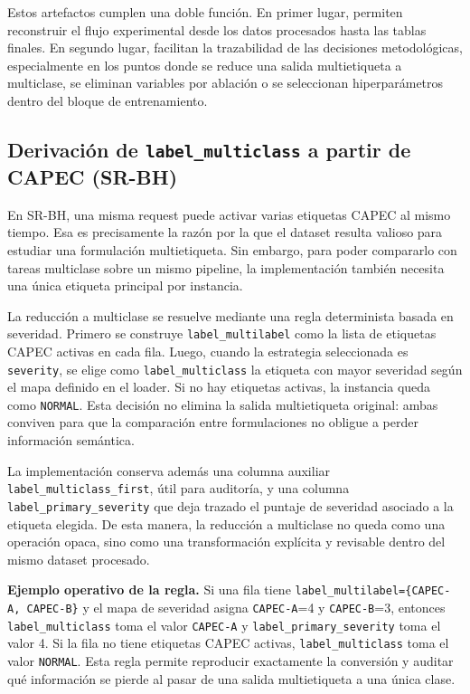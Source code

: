 \documentclass[12pt,oneside]{report}
\begin{document}
Estos artefactos cumplen una doble función. En primer lugar, permiten reconstruir el flujo experimental desde los datos procesados hasta las tablas finales. En segundo lugar, facilitan la trazabilidad de las decisiones metodológicas, especialmente en los puntos donde se reduce una salida multietiqueta a multiclase, se eliminan variables por ablación o se seleccionan hiperparámetros dentro del bloque de entrenamiento.

\subsection{Derivación de \texttt{label\_multiclass} a partir de CAPEC (SR-BH)}
En SR-BH, una misma request puede activar varias etiquetas CAPEC al mismo tiempo. Esa es precisamente la razón por la que el dataset resulta valioso para estudiar una formulación multietiqueta. Sin embargo, para poder compararlo con tareas multiclase sobre un mismo pipeline, la implementación también necesita una única etiqueta principal por instancia.

La reducción a multiclase se resuelve mediante una regla determinista basada en severidad. Primero se construye \texttt{label\_multilabel} como la lista de etiquetas CAPEC activas en cada fila. Luego, cuando la estrategia seleccionada es \texttt{severity}, se elige como \texttt{label\_multiclass} la etiqueta con mayor severidad según el mapa definido en el loader. Si no hay etiquetas activas, la instancia queda como \texttt{NORMAL}. Esta decisión no elimina la salida multietiqueta original: ambas conviven para que la comparación entre formulaciones no obligue a perder información semántica.

La implementación conserva además una columna auxiliar \texttt{label\_multiclass\_first}, útil para auditoría, y una columna \texttt{label\_primary\_severity} que deja trazado el puntaje de severidad asociado a la etiqueta elegida. De esta manera, la reducción a multiclase no queda como una operación opaca, sino como una transformación explícita y revisable dentro del mismo dataset procesado.

\textbf{Ejemplo operativo de la regla.} Si una fila tiene \texttt{label\_multilabel=\{CAPEC-A, CAPEC-B\}} y el mapa de severidad asigna \texttt{CAPEC-A}=4 y \texttt{CAPEC-B}=3, entonces \texttt{label\_multiclass} toma el valor \texttt{CAPEC-A} y \texttt{label\_primary\_severity} toma el valor 4. Si la fila no tiene etiquetas CAPEC activas, \texttt{label\_multiclass} toma el valor \texttt{NORMAL}. Esta regla permite reproducir exactamente la conversión y auditar qué información se pierde al pasar de una salida multietiqueta a una única clase.
\end{document}
